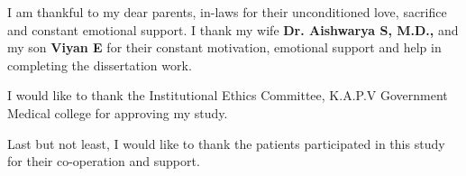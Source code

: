 I am thankful to my dear parents, in-laws for their unconditioned love,
sacrifice and constant emotional support. I thank my wife \textbf {Dr. Aishwarya S, M.D.,} and my son \textbf {Viyan E} for their constant motivation, emotional support and help in completing the dissertation work. \par

I would like to thank the Institutional Ethics Committee, K.A.P.V Government Medical
college for approving my study. \par

Last but not least, I would like to thank the patients participated in this
study for their co-operation and support. \par
